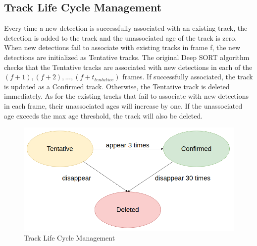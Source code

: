     \subsection{Track Life Cycle Management}
        Every time a new detection is successfully associated with an existing track, the detection is added to the track and the unassociated age of the track is zero. When new detections fail to associate with existing tracks in frame f, the new detections are initialized as Tentative tracks. The original Deep SORT algorithm checks that the Tentative tracks are 
        associated with new detections in each of the \emph{$(f + 1), (f + 2),...,(f + t_{tentative})$} frames. If successfully associated, the track is updated as a Confirmed track. Otherwise, the Tentative track is deleted immediately. As for the existing tracks that fail to associate with new detections in each frame, their unassociated ages will increase by one. 
        If the unassociated age exceeds the max age threshold, the track will also be deleted.
        \begin{figure}[H]
            \centering
            \includegraphics[width=0.6\linewidth]{img/track-life.png}
            \caption{Track Life Cycle Management}
        \end{figure}

